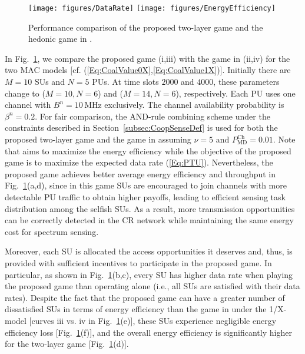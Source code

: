 \documentclass[journal,draftclsnofoot,onecolumn]{IEEEtran}
\theoremstyle{definition}
\def\FigScale{0.6}
\def\FigScale{0.65}
\begin{document}
\begin{figure}[!t]
    \centering
    \texttt{[image: figures/DataRate]}
		\texttt{[image: figures/EnergyEfficiency]}
    \caption{Performance comparison of the proposed two-layer game and the hedonic game in \cite{HedonicSenseGame}.}
    \label{Fig:EnergyEfficiency}
\end{figure}


In Fig.~\ref{Fig:EnergyEfficiency}, we compare the proposed game (i,iii) with the game in \cite{HedonicSenseGame} (ii,iv) for the two MAC models [cf. (\ref{Eq:CoalValue0X},\ref{Eq:CoalValue1X})]. Initially there are $M=10$ SUs and $N=5$ PUs. At time slots $2000$ and $4000$, these parameters change to ($M=10,N=6$) and ($M=14,N=6$), respectively. Each PU uses one channel with $B^n=10$\,MHz exclusively. The channel availability probability is $\beta^n=0.2$. For fair comparison, the AND-rule combining scheme under the constraints described in Section~\ref{subsec:CoopSenseDef} is used for both the proposed two-layer game and the game in \cite{HedonicSenseGame} assuming $\nu=5$ and $P_\mathrm{MD}^\mathrm{Ch}=0.01$. Note that \cite{HedonicSenseGame} aims to maximize the energy efficiency while the objective of the proposed game is to maximize the expected data rate (\ref{Eq:PTU}). Nevertheless, the proposed game achieves better average energy efficiency and throughput in Fig.~\ref{Fig:EnergyEfficiency}(a,d), since
in this game SUs are encouraged to join channels with more detectable PU traffic to obtain higher payoffs, leading to efficient sensing task distribution among the selfish SUs. As a result, more transmission opportunities can be correctly detected in the CR network while maintaining the same energy cost for spectrum sensing.

Moreover, each SU is allocated the access opportunities it deserves and, thus, is provided with sufficient incentives to participate in the proposed game. In particular, as shown in Fig.~\ref{Fig:EnergyEfficiency}(b,c), every SU has higher data rate when playing the proposed game than operating alone (i.e., all SUs are satisfied with their data rates). Despite the fact that the proposed game can have a greater number of dissatisfied SUs in terms of energy efficiency than the game in \cite{HedonicSenseGame} under the 1/X-model [curves iii vs. iv in Fig.~\ref{Fig:EnergyEfficiency}(e)], these SUs experience negligible energy efficiency loss [Fig.~\ref{Fig:EnergyEfficiency}(f)], and the overall energy efficiency is significantly higher for the two-layer game [Fig.~\ref{Fig:EnergyEfficiency}(d)]. 
\end{document}
